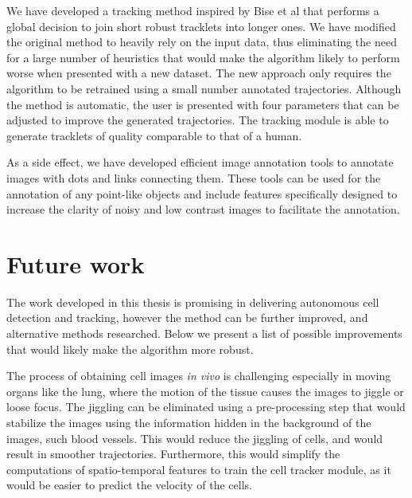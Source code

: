 We have developed a tracking method inspired by Bise et al \cite{bise11global} that performs a global decision to join short robust tracklets into longer ones. We have modified the original method to heavily rely on the input data, thus eliminating the need for a large number of heuristics that would make the algorithm likely to perform worse when presented with a new dataset. The new approach only requires the algorithm to be retrained using a small number annotated trajectories. Although the method is automatic, the user is presented with four parameters that can be adjusted to improve the generated trajectories. The tracking module is able to generate tracklets of quality comparable to that of a human.

As a side effect, we have developed efficient image annotation tools to annotate images with dots and links connecting them. These tools can be used for the annotation of any point-like objects and include features specifically designed to increase the clarity of noisy and low contrast images to facilitate the annotation.



\section{Future work \statusfirstdraft}
\label{sec:conclusion_futurework}


The work developed in this thesis is promising in delivering autonomous cell detection and tracking, however the method can be further improved, and alternative methods researched. Below we present a list of possible improvements that would likely make the algorithm more robust.

The process of obtaining cell images \textit{in vivo} is challenging especially in moving organs like the lung, where the motion of the tissue causes the images to jiggle or loose focus. The jiggling can be eliminated using a pre-processing step that would stabilize the images using the information hidden in the background of the images, such blood vessels. This would reduce the jiggling of cells, and would result in smoother trajectories. Furthermore, this would simplify the computations of spatio-temporal features to train the cell tracker module, as it would be easier to predict the velocity of the cells.

